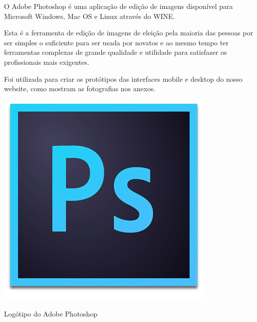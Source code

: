 \documentclass[11pt]{report}
\begin{document}
\centering
\begin{minipage}{.45\linewidth}
	O Adobe Photoshop é uma aplicação de edição de imagens disponível para Microsoft Windows, Mac OS e Linux através do WINE.

	Esta é a ferramenta de edição de imagens de eleição pela maioria das pessoas por ser simples o suficiente para ser usada por novatos e ao mesmo tempo ter ferramentas complexas de grande qualidade e utilidade para satisfazer os profissionais mais exigentes.
	
	Foi utilizada para criar os protótipos das interfaces mobile e desktop do nosso website, como mostram as fotografias nos anexos.\\
\end{minipage}
\hspace{.15\linewidth}
\begin{minipage}{.20\linewidth}
  \includegraphics[width=\linewidth]{photoshop.png}
  \caption{Logótipo do Adobe Photoshop}
  \label{img3}
\end{minipage}
\end{document}
